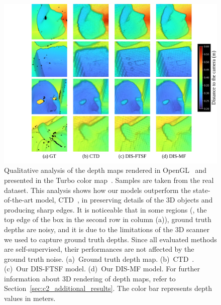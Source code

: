 \begin{figure}[t]
    \begin{center}
    \includegraphics[width=1.0\linewidth]{images/chapter2/supp_figures/rendered_real.jpg}
    \end{center}
   \caption{Qualitative analysis of the depth maps rendered in OpenGL~\citep{shreiner2013opengl} and presented in the Turbo color map~\citep{mikhailov2019turbo}. Samples are taken from the real dataset. This analysis shows how our models outperform the state-of-the-art model, CTD~\citep{riegler2019connecting}, in preserving details of the 3D objects and producing sharp edges. It is noticeable that in some regions (\eg, the top edge of the box in the second row in column (a)), ground truth depths are noisy, and it is due to the limitations of the 3D scanner we used to capture ground truth depths. Since all evaluated methods are self-supervised, their performances are not affected by the ground truth noise. (a)~Ground truth depth map. (b)~CTD~\citep{riegler2019connecting}. (c)~Our DIS-FTSF model. (d)~Our DIS-MF model. For further information about 3D rendering of depth maps, refer to Section~\ref{sec:c2_additional_results}. The color bar represents depth values in meters.}
    \label{fig:c2_rendered_real}
\end{figure}
